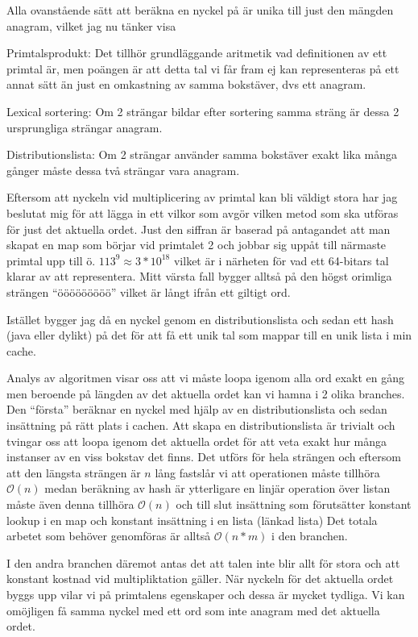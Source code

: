 \documentclass[a4paper,11pt,twoside]{article}
\begin{document}
Alla ovanstående sätt att beräkna en nyckel på är unika till just den mängden anagram, vilket jag nu tänker visa

Primtalsprodukt: Det tillhör grundläggande aritmetik vad definitionen av ett primtal är, men poängen är att detta tal vi får fram ej kan representeras på ett annat sätt än just en omkastning av samma bokstäver, dvs ett anagram.

Lexical sortering: Om 2 strängar bildar efter sortering samma sträng är dessa 2 ursprungliga strängar anagram.

Distributionslista: Om 2 strängar använder samma bokstäver exakt lika många gånger måste dessa två strängar vara anagram.

Eftersom att nyckeln vid multiplicering av primtal kan bli väldigt stora har jag beslutat mig för att lägga in ett vilkor som avgör vilken metod som ska utföras för just det aktuella ordet. Just den siffran är baserad på antagandet att man skapat en map som börjar vid primtalet 2 och jobbar sig uppåt till närmaste primtal upp till ö. $113^9 \approx 3*10^{18}$ vilket är i närheten för vad ett 64-bitars tal klarar av att representera. Mitt värsta fall bygger alltså på den högst orimliga strängen ``ööööööööö'' vilket är långt ifrån ett giltigt ord.

Istället bygger jag då en nyckel genom en distributionslista och sedan ett hash (java eller dylikt) på det för att få ett unik tal som mappar till en unik lista i min cache.

Analys av algoritmen visar oss att vi måste loopa igenom alla ord exakt en gång men beroende på längden av det aktuella ordet kan vi hamna i 2 olika branches. Den ``första'' beräknar en nyckel med hjälp av en distributionslista och sedan insättning på rätt plats i cachen.
Att skapa en distributionslista är trivialt och tvingar oss att loopa igenom det aktuella ordet för att veta exakt hur många instanser av en viss bokstav det finns. Det utförs för hela strängen och eftersom att den längsta strängen är $n$ lång fastslår vi att operationen måste tillhöra $\mathcal{O}(n)$ medan beräkning av hash är ytterligare en linjär operation över listan måste även denna tillhöra $\mathcal{O}(n)$
och till slut insättning som förutsätter konstant lookup i en map och konstant insättning i en lista (länkad lista)
Det totala arbetet som behöver genomföras är alltså $\mathcal{O}(n*m)$ i den branchen.

I den andra branchen däremot antas det att talen inte blir allt för stora och att konstant kostnad vid multipliktation gäller.
När nyckeln för det aktuella ordet byggs upp vilar vi på primtalens egenskaper och dessa är mycket tydliga. Vi kan omöjligen få samma nyckel med ett ord som inte anagram med det aktuella ordet.
\end{document}
